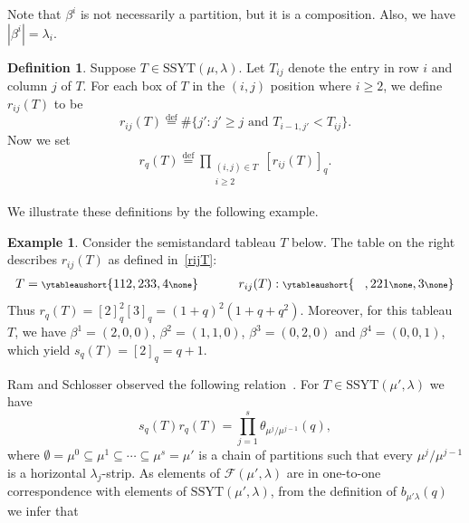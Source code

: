 \documentclass[12pt,a4paper,reqno]{amsart}
\theoremstyle{plain}
\theoremstyle{definition}
\newtheorem{definition}[theorem]{Definition}
\newtheorem{example}[theorem]{Example}
\newcommand{\defin}{\overset{\mathrm{def}}{=}}
\newcommand{\ssyt}{\mathrm{SSYT}}
\newcommand{\1}{\mathds{1}}
\begin{document}
Note that $\beta^i$ is not necessarily a partition, but it is a composition. Also, we have $|\beta^i|=\lambda_i$.     




\begin{definition}\label{def:rqt}
Suppose $T\in \ssyt(\mu,\lambda)$.  
Let $T_{ij}$ denote the entry in row $i$ and column $j$ of  $T$. For each box of $T$ in the $(i,j)$ position where $i\geq 2$, we define $r_{ij}(T)$ to be
\begin{equation}\label{rijT}
  r_{ij}(T)\defin\#\{j':j'\geq j\mbox{ and }T_{i-1,j'}<T_{ij}\}.
\end{equation}
Now we set
\begin{align*}  r_q(T)\defin\prod_{
\substack{
(i,j)
\in T\\
 i
 \geq 2}}[r_{ij}(T)]_q.
\end{align*}  
\end{definition}
We illustrate these definitions by the following  example.
\begin{example}\label{example} Consider the semistandard tableau $T$ below. The table on the right describes $r_{ij}(T)$ as defined in~\cref{rijT}:   
  \begin{align}\label{Example_T}
  \scriptsize
T=\ytableaushort{112,233,4 \none}\qquad\qquad r_{ij}(T): 
   \ytableaushort{\ \ \  ,221\none,3 \none}
  \end{align}
Thus $r_q(T)=[2]_q^2[3]_q=(1+q)^2(1+q+q^2)$. Moreover, for this tableau $T$, we have $\beta^1=(2,0,0)$, $\beta^2=(1,1,0)$, $\beta^3=(0,2,0)$ and $\beta^4=(0,0,1)$, which yield $s_q(T)=[2]_q=q+1$.
  \end{example} 

Ram and Schlosser observed the following relation~\cite[Definition 3.7 and Proposition 5.1]{Ram}. For $T\in\ssyt(\mu',\lambda)$ we have 
$$
s_q(T)r_q(T)=\prod_{j=1}^s\theta_{\mu^j/\mu^{j-1}}(q),
$$
where $\emptyset=\mu^0\subseteq\mu^1\subseteq\cdots\subseteq\mu^s=\mu'$ is a chain of partitions such that every $\mu^j/\mu^{j-1}$ is a horizontal $\lambda_j$-strip. As elements of $\mathcal{F}(\mu',\lambda)$ are in one-to-one correspondence with elements of $\ssyt(\mu',\lambda)$, from the definition of $b_{\mu'\lambda}(q)$ we infer that
\end{document}
